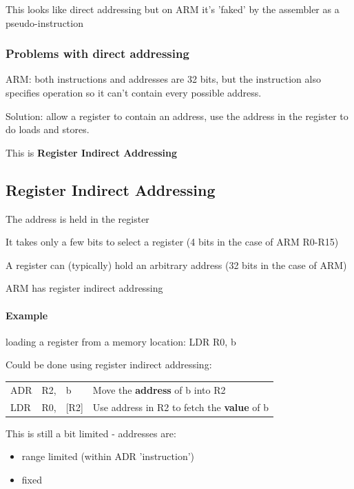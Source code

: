 This looks like direct addressing but on ARM it's 'faked' by the assembler as a
pseudo-instruction

\subsubsection{Problems with direct addressing}

ARM: both instructions and addresses are 32 bits, but the instruction also
specifies operation so it can't contain every possible address.

Solution: allow a register to contain an address, use the address in the
register to do loads and stores.

This is {\bf Register Indirect Addressing}

\subsection{Register Indirect Addressing}
The address is held in the register

It takes only a few bits to select a register (4 bits in the case of ARM R0-R15)

A register can (typically) hold an arbitrary address (32 bits in the case of
ARM)

ARM has register indirect addressing

\paragraph{Example}
loading a register from a memory location: LDR R0, b

Could be done using register indirect addressing:

\begin{center}
    \begin{tabularx}{0.8\textwidth}{l l l X}
        ADR & R2, & b & Move the {\bf address} of b into R2\\
        LDR & R0, & [R2] & Use address in R2 to fetch the {\bf value} of b\\
    \end{tabularx}
\end{center}

This is still a bit limited - addresses are:

\begin{itemize}
  \item range limited (within ADR 'instruction')
  \item fixed
\end{itemize}

